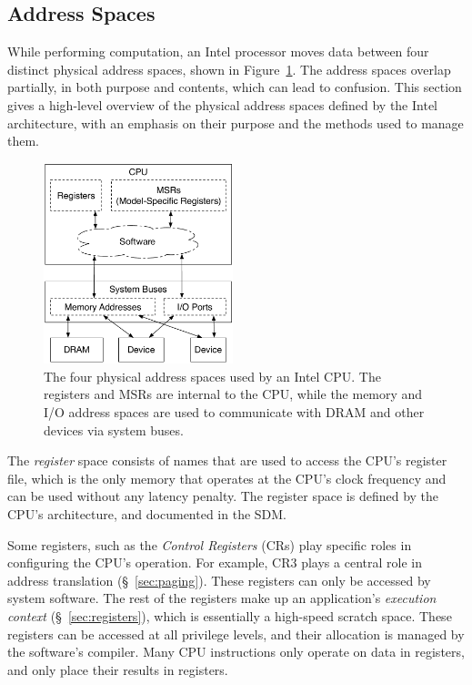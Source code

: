 \subsection{Address Spaces}
\label{sec:address_spaces}

While performing computation, an Intel processor moves data between four
distinct physical address spaces, shown in Figure~\ref{fig:address_spaces}. The
address spaces overlap partially, in both purpose and contents, which can lead
to confusion. This section gives a high-level overview of the physical address
spaces defined by the Intel architecture, with an emphasis on their purpose and
the methods used to manage them.

\begin{figure}[hbtp]
  \centering
  \includegraphics[width=55mm]{figures/address_spaces.pdf}
  \caption{
    The four physical address spaces used by an Intel CPU. The registers and
    MSRs are internal to the CPU, while the memory and I/O address spaces are
    used to communicate with DRAM and other devices via system buses.
  }
  \label{fig:address_spaces}
\end{figure}

The \textit{register} space consists of names that are used to access the CPU's
register file, which is the only memory that operates at the CPU's clock
frequency and can be used without any latency penalty. The register space is
defined by the CPU's architecture, and documented in the SDM.

Some registers, such as the \textit{Control Registers} (CRs) play specific
roles in configuring the CPU's operation. For example, CR3 plays a central role
in address translation (\S~\ref{sec:paging}). These registers can only be
accessed by system software. The rest of the registers make up an application's
\textit{execution context} (\S~\ref{sec:registers}), which is essentially a
high-speed scratch space. These registers can be accessed at all privilege
levels, and their allocation is managed by the software's compiler. Many CPU
instructions only operate on data in registers, and only place their results in
registers.

